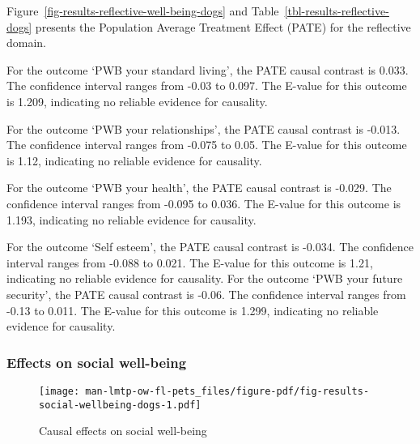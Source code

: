 \documentclass[
  singlecolumn,
  9pt]{article}
\begin{document}
Figure~\ref{fig-results-reflective-well-being-dogs} and
Table~\ref{tbl-results-reflective-dogs} presents the Population Average
Treatment Effect (PATE) for the reflective domain.

For the outcome `PWB your standard living', the PATE causal contrast is
0.033. The confidence interval ranges from -0.03 to 0.097. The E-value
for this outcome is 1.209, indicating no reliable evidence for
causality.

For the outcome `PWB your relationships', the PATE causal contrast is
-0.013. The confidence interval ranges from -0.075 to 0.05. The E-value
for this outcome is 1.12, indicating no reliable evidence for causality.

For the outcome `PWB your health', the PATE causal contrast is -0.029.
The confidence interval ranges from -0.095 to 0.036. The E-value for
this outcome is 1.193, indicating no reliable evidence for causality.

For the outcome `Self esteem', the PATE causal contrast is -0.034. The
confidence interval ranges from -0.088 to 0.021. The E-value for this
outcome is 1.21, indicating no reliable evidence for causality. For the
outcome `PWB your future security', the PATE causal contrast is -0.06.
The confidence interval ranges from -0.13 to 0.011. The E-value for this
outcome is 1.299, indicating no reliable evidence for causality.

\newpage{}

\subsubsection{Effects on social
well-being}\label{effects-on-social-well-being-1}

\begin{figure}

{\centering \texttt{[image: man-lmtp-ow-fl-pets\_files/figure-pdf/fig-results-social-wellbeing-dogs-1.pdf]}

}

\caption{\label{fig-results-social-wellbeing-dogs}Causal effects on
social well-being}

\end{figure}

\newpage{}
\end{document}
